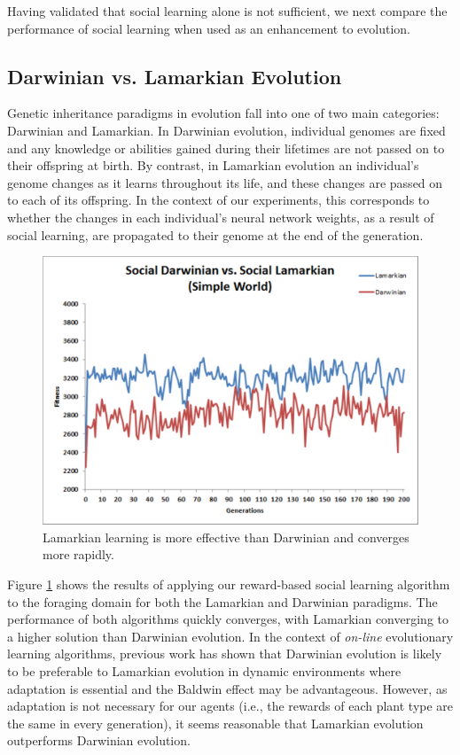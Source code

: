 \documentclass{acm_proc_article-sp}
\begin{document}
Having validated that social learning alone is not sufficient, we next compare the performance of social learning when used as an enhancement to evolution.


\subsection*{Darwinian vs. Lamarkian Evolution}

Genetic inheritance paradigms in evolution fall into one of two main categories: Darwinian and Lamarkian. In Darwinian evolution, individual genomes are fixed and any knowledge or abilities gained during their lifetimes are not passed on to their offspring at birth. By contrast, in Lamarkian evolution an individual's genome changes as it learns throughout its life, and these changes are passed on to each of its offspring. In the context of our experiments, this corresponds to whether the changes in each individual's neural network weights, as a result of social learning, are propagated to their genome at the end of the generation.

\begin{figure}
  \centering
    \includegraphics[scale=.35]{darwinian_vs_lamarkian_evolution.pdf}
  \caption{Lamarkian learning is more effective than Darwinian and converges more rapidly.}
  \label{fig:darwin-lamark}
\end{figure}


Figure \ref{fig:darwin-lamark} shows the results of applying our reward-based social learning algorithm to the foraging domain for both the Lamarkian and Darwinian paradigms. The performance of both algorithms quickly converges, with Lamarkian converging to a higher solution than Darwinian evolution. In the context of \textit{on-line} evolutionary learning algorithms, previous work \cite{whiteson2006evolutionary} has shown that Darwinian evolution is likely to be preferable to Lamarkian evolution in dynamic environments where adaptation is essential and the Baldwin effect \cite{simpson1953baldwin} may be advantageous. However, as adaptation is not necessary for our agents (i.e., the rewards of each plant type are the same in every generation), it seems reasonable that Lamarkian evolution outperforms Darwinian evolution.
\end{document}
